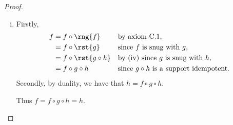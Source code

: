 \begin{proof}
\begin{enumerate}[(i)]
\begin{align*}
                &= \rst{f \circ \rng{f}}
                             && \mbox{by the initial assumption,} \\
                &= \rst{f}   && \mbox{by C.1.}
\end{align*} 
That $\rng{f \circ g} = \rng{g}$ follows by duality.
\item %
Firstly,
\begin{align*}
f &= f \circ \rng{f} 
                && \mbox{by axiom C.1,} \\
  &= f \circ \rst{g}
                && \mbox{since $f$ is snug with $g$,} \\
  &= f \circ \rst{g \circ h}
                && \mbox{by (iv) since $g$ is snug with $h$,} \\
  &= f \circ g \circ h
                && \mbox{since $g \circ h$ is a support idempotent.} 
\end{align*}
Secondly, by duality, we have that $h = f \circ g \circ h$. 

Thus $f= f \circ g \circ h = h$.
\end{enumerate}
\end{proof}


